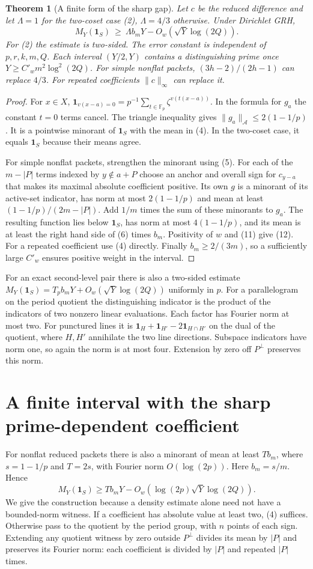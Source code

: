 \documentclass[11pt,letterpaper]{article}
\newcommand{\F}{\mathbb F}
\newcommand{\ind}{\mathbf 1}
\newtheorem{theorem}{Theorem}
\newcommand{\heading}[1]{\section*{\color{ink}#1}}
\begin{document}
\begin{theorem}[A finite form of the sharp gap]\label{thm:finite}
Let $c$ be the reduced difference and let $\Lambda=1$ for the two-coset case (2), $\Lambda=4/3$ otherwise. Under Dirichlet GRH,
\[
    M_Y(\ind_S)\ \ge\ \Lambda b_m Y-O_w(\sqrt{Y}\log(2Q)).             \tag{12}
\]
For (2) the estimate is two-sided. The error constant is independent of $p,r,k,m,Q$. Each interval $(Y/2,Y)$ contains a distinguishing prime once $Y\ge C'_w m^2\log^2(2Q)$. For simple nonflat packets, $(3h-2)/(2h-1)$ can replace $4/3$. For repeated coefficients $\|c\|_\infty$ can replace it.
\end{theorem}

\begin{proof}
For $x\in X$, $\ind_{v(x-a)=0}=p^{-1}\sum_{t\in\F_p}\zeta^{v(t(x-a))}$. In the formula for $g_a$ the constant $t=0$ terms cancel. The triangle inequality gives $\|g_a\|_{\mathcal A}\le2(1-1/p)$. It is a pointwise minorant of $\ind_S$ with the mean in (4). In the two-coset case, it equals $\ind_S$ because their means agree.

For simple nonflat packets, strengthen the minorant using (5). For each of the $m-|P|$ terms indexed by $y\notin a+P$ choose an anchor and overall sign for $c_{y-a}$ that makes its maximal absolute coefficient positive. Its own $g$ is a minorant of its active-set indicator, has norm at most $2(1-1/p)$ and mean at least $(1-1/p)/(2m-|P|)$. Add $1/m$ times the sum of these minorants to $g_a$. The resulting function lies below $\ind_S$, has norm at most $4(1-1/p)$, and its mean is at least the right hand side of (6) times $b_m$. Positivity of $w$ and (11) give (12). For a repeated coefficient use (4) directly. Finally $b_m\ge2/(3m)$, so a sufficiently large $C'_w$ ensures positive weight in the interval.
\end{proof}

For an exact second-level pair there is also a two-sided estimate $M_Y(\ind_S)=T_p b_mY+O_w(\sqrt Y\log(2Q))$ uniformly in $p$. For a parallelogram on the period quotient the distinguishing indicator is the product of the indicators of two nonzero linear evaluations. Each factor has Fourier norm at most two. For punctured lines it is $\ind_H+\ind_{H'}-2\ind_{H\cap H'}$ on the dual of the quotient, where $H,H'$ annihilate the two line directions. Subspace indicators have norm one, so again the norm is at most four. Extension by zero off $P^\perp$ preserves this norm.

\newpage
\heading{A finite interval with the sharp prime-dependent coefficient}
For nonflat reduced packets there is also a minorant of mean at least $T b_m$, where $s=1-1/p$ and $T=2s$, with Fourier norm $O(\log(2p))$. Here $b_m=s/m$. Hence
\[
 M_Y(\ind_S)\ge T b_mY-O_w\!\left(\log(2p)\sqrt Y\log(2Q)\right).
\]
We give the construction because a density estimate alone need not have a bounded-norm witness. If a coefficient has absolute value at least two, (4) suffices. Otherwise pass to the quotient by the period group, with $n$ points of each sign. Extending any quotient witness by zero outside $P^\perp$ divides its mean by $|P|$ and preserves its Fourier norm: each coefficient is divided by $|P|$ and repeated $|P|$ times.
\end{document}
